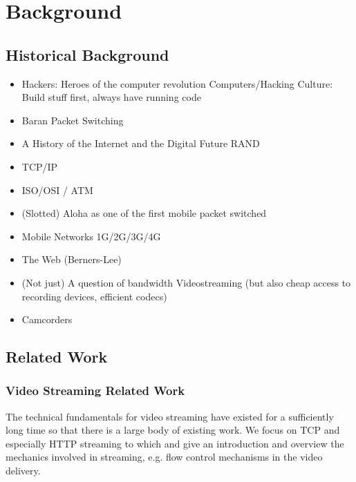 \chapter{Background}
\label{chap:relatedwork}



\section{Historical Background}

\begin{itemize}
\item Hackers: Heroes of the computer revolution \cite{levy2010hackers}
		Computers/Hacking Culture: Build stuff first, always have running code
\item Baran Packet Switching
\item A History of the Internet and the Digital Future \cite{ryan2010history}
		RAND
\item TCP/IP
\item ISO/OSI / ATM
\item (Slotted) Aloha as one of the first mobile packet switched
\item Mobile Networks 1G/2G/3G/4G
\item The Web (Berners-Lee)
\item (Not just) A question of bandwidth Videostreaming (but also cheap access to recording devices, efficient codecs)
\item Camcorders


\end{itemize}

\section{Related Work}

\subsection{Video Streaming Related Work}

The technical fundamentals for video streaming have existed for a sufficiently long time so that there is a large body of existing work. We focus on TCP and especially HTTP streaming to which \cite{watching-video1} and \cite{ma2011mobile} give an introduction and overview the mechanics involved in streaming, e.g. flow control mechanisms in the video delivery.

